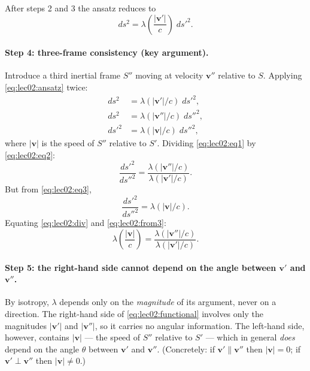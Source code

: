 After steps 2 and 3 the ansatz reduces to
\begin{equation}
  ds^2 = \lambda\!\left(\frac{|\mathbf{v}'|}{c}\right)\;ds'^2.
  \label{eq:lec02:ansatz}
\end{equation}

\paragraph{Step 4: three-frame consistency (key argument).}
Introduce a third inertial frame $S''$ moving at velocity
$\mathbf{v}''$ relative to $S$.  Applying \eqref{eq:lec02:ansatz}
twice:
\begin{align}
  ds^2   &= \lambda(|\mathbf{v}'|/c)\;ds'^2,
             \label{eq:lec02:eq1}\\
  ds^2   &= \lambda(|\mathbf{v}''|/c)\;ds''^2,
             \label{eq:lec02:eq2}\\
  ds'^2  &= \lambda(|\mathbf{v}|/c)\;ds''^2,
             \label{eq:lec02:eq3}
\end{align}
where $|\mathbf{v}|$ is the speed of $S''$ relative to $S'$.
Dividing \eqref{eq:lec02:eq1} by \eqref{eq:lec02:eq2}:
\begin{equation}
  \frac{ds'^2}{ds''^2}
  = \frac{\lambda(|\mathbf{v}''|/c)}{\lambda(|\mathbf{v}'|/c)}.
  \label{eq:lec02:div}
\end{equation}
But from \eqref{eq:lec02:eq3},
\begin{equation}
  \frac{ds'^2}{ds''^2} = \lambda(|\mathbf{v}|/c).
  \label{eq:lec02:from3}
\end{equation}
Equating \eqref{eq:lec02:div} and \eqref{eq:lec02:from3}:
\begin{equation}
  \lambda\!\left(\frac{|\mathbf{v}|}{c}\right)
  = \frac{\lambda(|\mathbf{v}''|/c)}{\lambda(|\mathbf{v}'|/c)}.
  \label{eq:lec02:functional}
\end{equation}

\paragraph{Step 5: the right-hand side cannot depend on the angle
between $\mathbf{v}'$ and $\mathbf{v}''$.}
By isotropy, $\lambda$ depends only on the \emph{magnitude} of its
argument, never on a direction.  The right-hand side of
\eqref{eq:lec02:functional} involves only the magnitudes
$|\mathbf{v}'|$ and $|\mathbf{v}''|$, so it carries no angular
information.  The left-hand side, however, contains
$|\mathbf{v}|$ — the speed of $S''$ relative to $S'$ — which in
general \emph{does} depend on the angle $\theta$ between $\mathbf{v}'$
and $\mathbf{v}''$.  (Concretely: if $\mathbf{v}' \parallel \mathbf{v}''$
then $|\mathbf{v}| = 0$; if $\mathbf{v}' \perp \mathbf{v}''$ then
$|\mathbf{v}| \neq 0$.)

